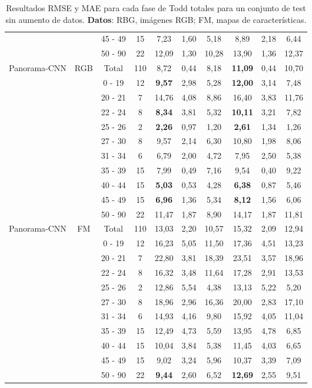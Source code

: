 \begin{table}[ht!]
{\begin{tabular}{|l|c|c|c|c|c|c|c|c|c|}
 &  & 45 - 49 & 15 & 7,23 & 1,60 & 5,18 & 8,89 & 2,18 & 6,44 \\
 &  & 50 - 90 & 22 & 12,09 & 1,30 & 10,28 & 13,90 & 1,36 & 12,37 \\ 
\hline
\multirow{11}{*}{Panorama-CNN} & \multirow{11}{*}{RGB} & Total & 110 & 8,72 & 0,44 & 8,18 & \textbf{11,09} & 0,44 & 10,70 \\
 &  & 0 - 19 & 12 & \textbf{9,57} & 2,98 & 5,28 & \textbf{12,00} & 3,14 & 7,48 \\
 &  & 20 - 21 & 7 & 14,76 & 4,08 & 8,86 & 16,40 & 3,83 & 11,76 \\
 &  & 22 - 24 & 8 & \textbf{8,34} & 3,81 & 5,32 & \textbf{10,11} & 3,21 & 7,82 \\
 &  & 25 - 26 & 2 & \textbf{2,26} & 0,97 & 1,20 & \textbf{2,61} & 1,34 & 1,26 \\
 &  & 27 - 30 & 8 & 9,57 & 2,14 & 6,30 & 10,80 & 1,98 & 8,06 \\
 &  & 31 - 34 & 6 & 6,79 & 2,00 & 4,72 & 7,95 & 2,50 & 5,38 \\
 &  & 35 - 39 & 15 & 7,99 & 0,49 & 7,16 & 9,54 & 0,40 & 9,22 \\
 &  & 40 - 44 & 15 & \textbf{5,03} & 0,53 & 4,28 & \textbf{6,38} & 0,87 & 5,46 \\
 &  & 45 - 49 & 15 & \textbf{6,96} & 1,36 & 5,34 & \textbf{8,12} & 1,56 & 6,06 \\
 &  & 50 - 90 & 22 & 11,47 & 1,87 & 8,90 & 14,17 & 1,87 & 11,81 \\ 
\hline
\multirow{11}{*}{Panorama-CNN} & \multirow{11}{*}{FM} & Total & 110 & 13,03 & 2,20 & 10,57 & 15,32 & 2,09 & 12,94 \\
 &  & 0 - 19 & 12 & 16,23 & 5,05 & 11,50 & 17,36 & 4,51 & 13,23 \\
 &  & 20 - 21 & 7 & 22,80 & 3,81 & 18,39 & 23,51 & 3,57 & 18,96 \\
 &  & 22 - 24 & 8 & 16,32 & 3,48 & 11,64 & 17,28 & 2,91 & 13,53 \\
 &  & 25 - 26 & 2 & 12,86 & 5,54 & 4,38 & 13,13 & 5,22 & 5,20 \\
 &  & 27 - 30 & 8 & 18,96 & 2,96 & 16,36 & 20,00 & 2,83 & 17,10 \\
 &  & 31 - 34 & 6 & 14,93 & 4,16 & 9,80 & 15,92 & 4,05 & 11,04 \\
 &  & 35 - 39 & 15 & 12,49 & 4,73 & 5,59 & 13,95 & 4,78 & 6,85 \\
 &  & 40 - 44 & 15 & 10,04 & 3,84 & 5,38 & 11,45 & 4,03 & 6,65 \\
 &  & 45 - 49 & 15 & 9,02 & 3,24 & 5,96 & 10,37 & 3,39 & 7,09 \\
 &  & 50 - 90 & 22 & \textbf{9,44} & 2,60 & 6,52 & \textbf{12,69} & 2,55 & 9,51 \\
\hline
\end{tabular}
}
\caption[Resultados RMSE y MAE para cada fase de Todd totales para un conjunto de test sin aumento de datos.]{Resultados RMSE y MAE para cada fase de Todd totales para un conjunto de test sin aumento de datos. \textbf{Datos}: RBG, imágenes RGB; FM, mapas de características.}
\label{tab:rtodd_s_total}
\end{table}
